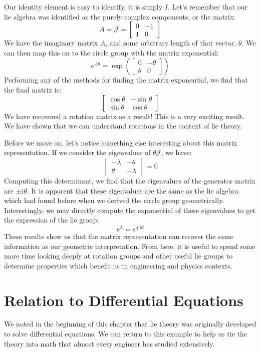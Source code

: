 Our identity element is easy to identify, it is simply $I$. Let's remember that our \gls{lie algebra} was identified as the purely complex components, or the matrix:
$$A=\mathcal{J}=\begin{bmatrix}
    0&-1\\1&0
\end{bmatrix}$$
We have the imaginary matrix $A$, and some arbitrary length of that vector, $\theta$. We can then map this on to the circle group with the matrix exponential:
$$e^{A\theta}=\exp\left(\begin{bmatrix}
    0&-\theta\\\theta&0
\end{bmatrix}\right)$$
Performing any of the methods for finding the matrix exponential, we find that the final matrix is:
$$\begin{bmatrix}
    \cos\theta&-\sin\theta\\\sin\theta&\cos\theta
\end{bmatrix}$$
We have recovered a rotation matrix as a result! This is a very exciting result. We have shown that we can understand rotations in the context of \gls{lie theory}. 

Before we move on, let's notice something else interesting about this matrix representation. If we consider the eigenvalues of $\theta \mathcal{J}$, we have:
$$\begin{vmatrix}
    -\lambda&-\theta\\\theta&-\lambda
\end{vmatrix}=0$$
Computing this determinant, we find that the eigenvalues of the generator matrix are $\pm i\theta $. It is apparent that these eigenvalues are the same as the \gls{lie algebra} which had found before when we derived the circle group geometrically. Interestingly, we may directly compute the exponential of these eigenvalues to get the expression of the \gls{lie group}:
$$e^\lambda=e^{\pm i\theta}$$
These results show us that the matrix representation can recover the same information as our geometric interpretation. From here, it is useful to spend some more time looking deeply at rotation groups and other useful \glspl{lie group} to determine properties which benefit us in engineering and physics contexts.


\section{Relation to Differential Equations}\label{sec:lie theory relation to differential equations}
We noted in the beginning of this chapter that \gls{lie theory} was originally developed to solve differential equations. We can return to this example to help us tie the theory into math that almost every engineer has studied extensively.

